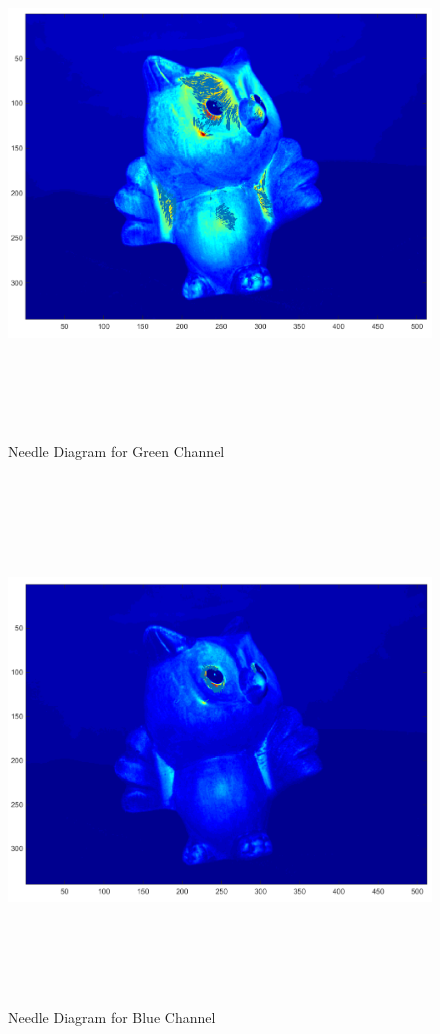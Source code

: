 \documentclass[11pt,psfig]{article}
\begin{document}
\begin{figure}[H]
\centering
\includegraphics[height=5.5in]{prob4needlePlot2.png}
\caption{Needle Diagram for Green Channel}
\end{figure}
\begin{figure}[H]
\centering
\includegraphics[height=5.5in]{prob4needlePlot3.png}
\caption{Needle Diagram for Blue Channel}
\end{figure}
\end{document}
